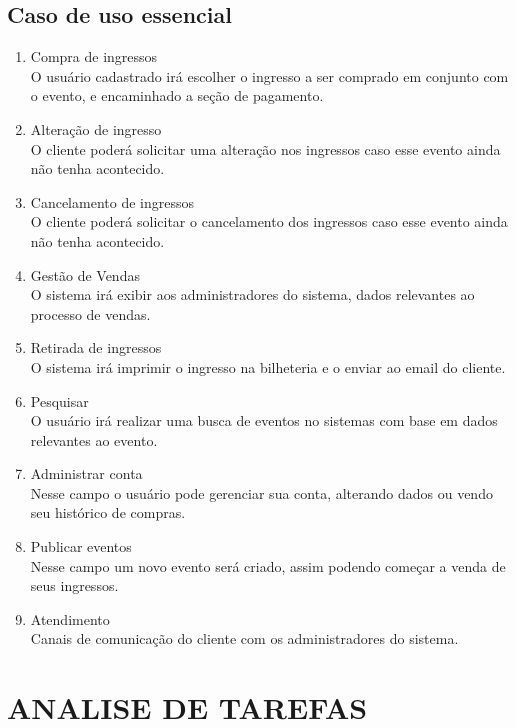 \documentclass[12pt]{article}
\begin{document}
        \subsection{Caso de uso essencial}
            \begin{enumerate}
                \item Compra de ingressos \\
                O usuário cadastrado irá escolher o ingresso a ser comprado em conjunto com o evento, e encaminhado a seção de pagamento.
                \item Alteração de ingresso \\
                O cliente poderá solicitar uma alteração nos ingressos caso esse evento ainda não tenha acontecido.
                \item Cancelamento de ingressos \\
                O cliente poderá solicitar o cancelamento dos ingressos caso esse evento ainda não tenha acontecido.
                \item Gestão de Vendas \\
                 O sistema irá exibir aos administradores do sistema, dados relevantes ao processo de vendas.
                \item Retirada de ingressos \\
                O sistema irá imprimir o ingresso na bilheteria e o enviar ao email do cliente.
                \item Pesquisar \\
                O usuário irá realizar uma busca de eventos no sistemas com base em dados relevantes ao evento.
                \item Administrar conta \\
                Nesse campo o usuário pode gerenciar sua conta, alterando dados ou vendo seu histórico de compras.
                \item Publicar eventos \\
                Nesse campo um novo evento será criado, assim podendo começar a venda de seus ingressos.
                \item Atendimento \\
                Canais de comunicação do cliente com os administradores do sistema.
            \end{enumerate}
        
    \section{ANALISE DE TAREFAS}
\end{document}
